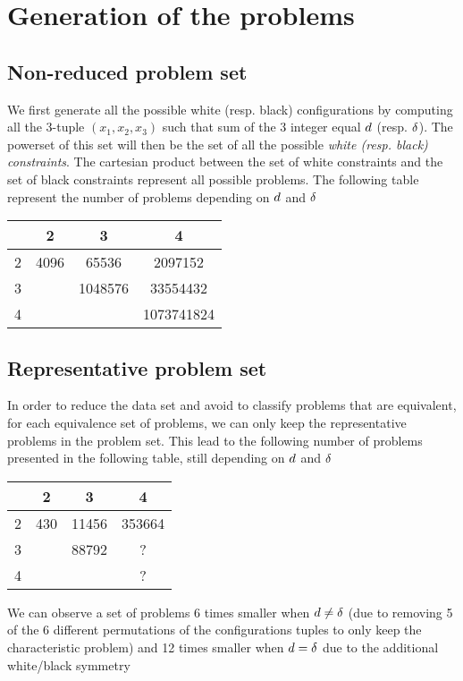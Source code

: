 \section{Generation of the problems}
\subsection{Non-reduced problem set}
We first generate all the possible white (resp. black) configurations by computing all the 3-tuple $(x_1,x_2, x_3)$ such that sum of the 3 integer equal $\wdd$ (resp. $\bdd$).
The powerset of this set will then be the set of all the possible \textit{white (resp. black) constraints}.
The cartesian product between the set of white constraints and the set of black constraints represent all possible problems. The following table represent the number of problems depending on $\wdd$ and $\bdd$
\begin{center}
\begin{tabular}{ | c | c | c | c |}
 \hline
 \diagbox{$\wdd$}{$\bdd$} & 2 & 3 & 4 \\ 
 \hline
 2 & 4096 & 65536 & 2097152\\
 \hline
 3 &  & 1048576 & 33554432\\
 \hline
 4 &  &  &  1073741824\\
\hline
\end{tabular}
\end{center}
\subsection{Representative problem set}
In order to reduce the data set and avoid to classify problems that are equivalent, for each equivalence set of problems, we can only keep the representative problems in the problem set. This lead to the following number of problems presented in the following table, still depending on $\wdd$ and $\bdd$
\begin{center}
\begin{tabular}{ | c | c | c | c |}
 \hline
 \diagbox{$\wdd$}{$\bdd$} & 2 & 3 & 4 \\ 
 \hline
 2 & 430 & 11456 & 353664\\
 \hline
 3 &  & 88792 & ?\\
 \hline
 4 &  &  &  ?\\
\hline
\end{tabular}
\end{center}

We can observe a set of problems 6 times smaller when $d \neq \delta$ (due to removing 5 of the 6 different permutations of the configurations tuples to only keep the characteristic problem) and 12 times smaller when $d=\delta$ due to the additional white/black symmetry

